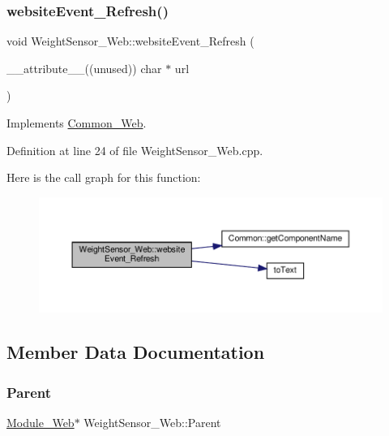 \subsubsection{\texorpdfstring{website\+Event\+\_\+\+Refresh()}{websiteEvent\_Refresh()}}
{\footnotesize\ttfamily void Weight\+Sensor\+\_\+\+Web\+::website\+Event\+\_\+\+Refresh (\begin{DoxyParamCaption}\item[{\+\_\+\+\_\+attribute\+\_\+\+\_\+((unused)) char $\ast$}]{url }\end{DoxyParamCaption})\hspace{0.3cm}{\ttfamily [virtual]}}



Implements \hyperlink{class_common___web_aaca7c54fdcf908e4e1256b7b1f6fc212}{Common\+\_\+\+Web}.



Definition at line 24 of file Weight\+Sensor\+\_\+\+Web.\+cpp.

Here is the call graph for this function\+:
\nopagebreak
\begin{figure}[H]
\begin{center}
\leavevmode
\includegraphics[width=350pt]{class_weight_sensor___web_aa47b67e39e6cbd1b543e482c94160a66_cgraph}
\end{center}
\end{figure}


\subsection{Member Data Documentation}
\mbox{\label{class_weight_sensor___web_aa3ac7e1b7e806eec4362085ed0e16f52}} 
\subsubsection{\texorpdfstring{Parent}{Parent}}
{\footnotesize\ttfamily \hyperlink{class_module___web}{Module\+\_\+\+Web}$\ast$ Weight\+Sensor\+\_\+\+Web\+::\+Parent\hspace{0.3cm}{\ttfamily [protected]}}




